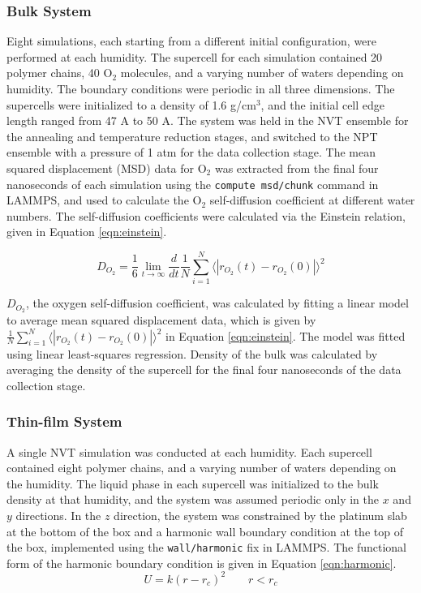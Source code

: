\documentclass[journal=jacsat,manuscript=article]{achemso}
\begin{document}
\subsubsection{Bulk System}
Eight simulations, each starting from a different initial configuration, were performed at each humidity. The supercell for each simulation contained 20 polymer chains, 40 O$_2$ molecules, and a varying number of waters depending on humidity. The boundary conditions were periodic in all three dimensions. The supercells were initialized to a density of 1.6 g/cm$^3$, and the initial cell edge length ranged from 47 A to 50 A. The system was held in the NVT ensemble for the annealing and temperature reduction stages, and switched to the NPT ensemble with a pressure of 1 atm for the data collection stage. The mean squared displacement (MSD) data for O$_2$ was extracted from the final four nanoseconds of each simulation using the \texttt{compute msd/chunk} command in LAMMPS, and used to calculate the O$_2$ self-diffusion coefficient at different water numbers. The self-diffusion coefficients were calculated via the Einstein relation, given in Equation \ref{eqn:einstein}. 

\begin{equation}
  \label{eqn:einstein}
  D_{O_2} = \frac{1}{6} \lim_{t \to \infty} \frac{d}{dt} \frac{1}{N} \sum_{i=1}^{N} \langle|r_{O_2}(t) - r_{O_2}(0)|\rangle^2 
\end{equation}

$D_{O_2}$, the oxygen self-diffusion coefficient, was calculated by fitting a linear model to average mean squared displacement data, which is given by $\frac{1}{N} \sum_{i=1}^{N} \langle|r_{O_2}(t) - r_{O_2}(0)|\rangle^2 $ in Equation \ref{eqn:einstein}. The model was fitted using linear least-squares regression. Density of the bulk was calculated by averaging the density of the supercell for the final four nanoseconds of the data collection stage. 
\subsubsection{Thin-film System}
A single NVT simulation was conducted at each humidity. Each supercell contained eight polymer chains, and a varying number of waters depending on the humidity. The liquid phase in each supercell was initialized to the bulk density at that humidity, and the system was assumed periodic only in the $x$ and $y$ directions. In the $z$ direction, the system was constrained by the platinum slab at the bottom of the box and a harmonic wall boundary condition at the top of the box, implemented using the \texttt{wall/harmonic} fix in LAMMPS. The functional form of the harmonic boundary condition is given in Equation \ref{eqn:harmonic}. 
\begin{equation}
    \label{eqn:harmonic}
    U = k(r-r_c)^2 \qquad r < r_c
\end{equation}
\end{document}
